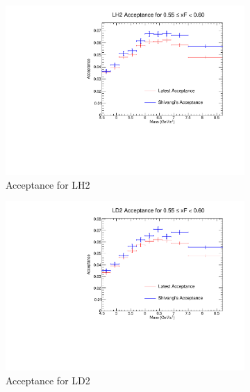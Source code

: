 \documentclass[11pt]{article}
\begin{document}
\begin{figure}[p]
    \centering
    \begin{subfigure}[b]{0.48\textwidth}
       \includegraphics[width=\linewidth]{./acceptancePlots/LH2_acceptance_xF_bin_11.pdf}
       \caption{Acceptance for LH2}
    \end{subfigure}\hfill
    \begin{subfigure}[b]{0.48\textwidth}
       \includegraphics[width=\linewidth]{./acceptancePlots/LD2_acceptance_xF_bin_11.pdf}
       \caption{Acceptance for LD2}
    \end{subfigure}
    \begin{subfigure}[b]{0.48\textwidth}

\end{subfigure}
\end{figure}
\end{document}
